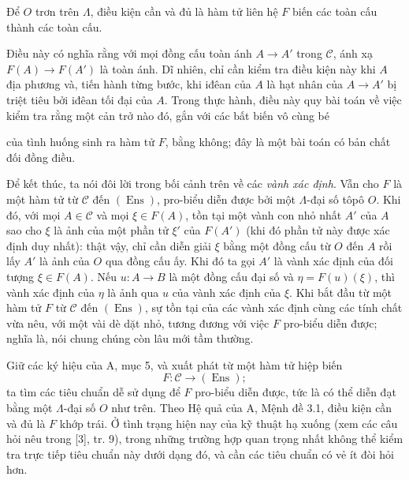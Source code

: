  Để $O$ trơn trên $\Lambda$, điều kiện cần và đủ là hàm
tử liên hệ $F$ biến các toàn cấu thành các toàn cấu.

Điều này có nghĩa rằng với mọi đồng cấu toàn ánh
$A\longrightarrow A'$ trong $\mathcal C$, ánh xạ
$F(A)\longrightarrow F(A')$ là toàn ánh. Dĩ nhiên, chỉ cần kiểm tra điều kiện
này khi $A$ địa phương và, tiến hành từng bước, khi iđêan của $A$ là hạt nhân
của $A\longrightarrow A'$ bị triệt tiêu bởi iđêan tối đại của $A$. Trong
thực hành, điều này quy bài toán về việc kiểm tra rằng một cản trở nào đó,
gắn với các bất biến vô cùng bé

của tình huống sinh ra hàm tử $F$, bằng không; đây là một bài toán có bản
chất đối đồng điều.

Để kết thúc, ta nói đôi lời trong bối cảnh trên về các \emph{vành xác định}.
Vẫn cho $F$ là một hàm tử từ $\mathcal C$ đến $(\operatorname{Ens})$,
pro-biểu diễn được bởi một $\Lambda$-đại số tôpô $O$. Khi đó, với mọi
$A\in\mathcal C$ và mọi $\xi\in F(A)$, tồn tại một vành con nhỏ nhất $A'$ của
$A$ sao cho $\xi$ là ảnh của một phần tử $\xi'$ của $F(A')$ (khi đó phần tử
này được xác định duy nhất): thật vậy, chỉ cần diễn giải $\xi$ bằng một đồng
cấu từ $O$ đến $A$ rồi lấy $A'$ là ảnh của $O$ qua đồng cấu ấy. Khi đó ta
gọi $A'$ là vành xác định của đối tượng $\xi\in F(A)$. Nếu
$u:A\longrightarrow B$ là một đồng cấu đại số và $\eta=F(u)(\xi)$, thì vành
xác định của $\eta$ là ảnh qua $u$ của vành xác định của $\xi$. Khi bắt đầu
từ một hàm tử $F$ từ $\mathcal C$ đến $(\operatorname{Ens})$, sự tồn tại của
các vành xác định cùng các tính chất vừa nêu, với một vài dè dặt nhỏ, tương
đương với việc $F$ pro-biểu diễn được; nghĩa là, nói chung chúng còn lâu mới
tầm thường.


Giữ các ký hiệu của A, mục 5, và xuất phát từ một hàm tử hiệp biến
\[
  F:\mathcal C\longrightarrow(\operatorname{Ens});
\]
ta tìm các tiêu chuẩn dễ sử dụng để $F$ pro-biểu diễn được, tức là có thể
diễn đạt bằng một $\Lambda$-đại số $O$ như trên. Theo Hệ quả của A, Mệnh đề
3.1, điều kiện cần và đủ là $F$ khớp trái. Ở tình trạng hiện nay của kỹ thuật
hạ xuống (xem các câu hỏi nêu trong [3], tr. 9), trong những trường hợp quan
trọng nhất không thể kiểm tra trực tiếp tiêu chuẩn này dưới dạng đó, và cần
các tiêu chuẩn có vẻ ít đòi hỏi hơn.

